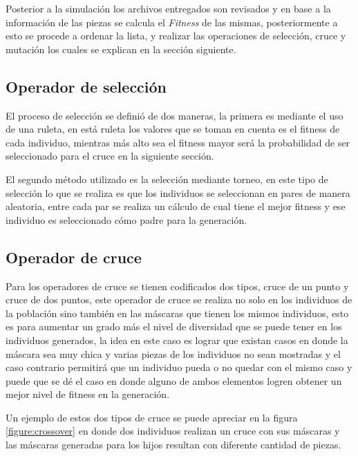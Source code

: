 Posterior a la simulación los archivos entregados son revisados y en base a la
información de las piezas se calcula el \textit{Fitness} de las mismas,
posteriormente a esto se procede a ordenar la lista, y realizar las operaciones
de selección, cruce y mutación los cuales se explican en la sección siguiente.

\subsection{Operador de selección}
\label{subsection:sel_operator}

El proceso de selección se definió de dos maneras, la primera es
mediante el uso de una ruleta, en está ruleta los valores que
se toman en cuenta es el fitness de cada individuo, mientras más alto sea el
fitness mayor será la probabilidad de ser seleccionado para el cruce en la
siguiente sección.

El segundo método utilizado es la selección mediante torneo, en este tipo de
selección lo que se realiza es que los individuos se seleccionan en pares de
manera aleatoria, entre cada par se realiza un cálculo de cual tiene el mejor
fitness y ese individuo es seleccionado cómo padre para la generación.

\subsection{Operador de cruce}
\label{subsection:crossover_operator}

Para los operadores de cruce se tienen codificados dos tipos, cruce de un punto
y cruce de dos puntos, este operador de cruce se realiza no solo en los
individuos de la población sino también en las máscaras que tienen los mismos
individuos, esto es para aumentar un grado más el nivel de diversidad que se
puede tener en los individuos generados, la idea en este caso es lograr que
existan casos en donde la máscara sea muy chica y varias piezas de los
individuos no sean mostradas y el caso contrario permitirá que un individuo
pueda o no quedar con el mismo caso y puede que se dé el caso en donde alguno de
ambos elementos logren obtener un mejor nivel de fitness en la generación.

Un ejemplo de estos dos tipos de cruce se puede apreciar en la figura
\ref{figure:crossover} en donde dos individuos realizan un cruce con sus
máscaras y las máscaras generadas para los hijos resultan con diferente cantidad
de piezas.

